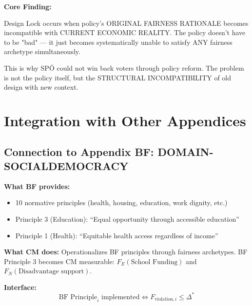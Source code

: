 \textbf{Core Finding:}

Design Lock occurs when policy's ORIGINAL FAIRNESS RATIONALE becomes incompatible with
CURRENT ECONOMIC REALITY. The policy doesn't have to be "bad" — it just becomes
systematically unable to satisfy ANY fairness archetype simultaneously.

This is why SPÖ could not win back voters through policy reform. The problem is not
the policy itself, but the STRUCTURAL INCOMPATIBILITY of old design with new context.

\section{Integration with Other Appendices}
\label{sec:cm-integration}

\subsection{Connection to Appendix BF: DOMAIN-SOCIALDEMOCRACY}

\textbf{What BF provides:}
\begin{itemize}[nosep]
\item 10 normative principles (health, housing, education, work dignity, etc.)
\item Principle 3 (Education): ``Equal opportunity through accessible education''
\item Principle 1 (Health): ``Equitable health access regardless of income''
\end{itemize}

\textbf{What CM does:}
Operationalizes BF principles through fairness archetypes. BF Principle 3 becomes
CM measurable: $F_E(\text{School Funding})$ and $F_N(\text{Disadvantage support})$.

\textbf{Interface:}
\begin{equation}
\text{BF Principle}_i \text{ implemented} \iff F_{\text{violation},i} \leq \Delta^*
\end{equation}

